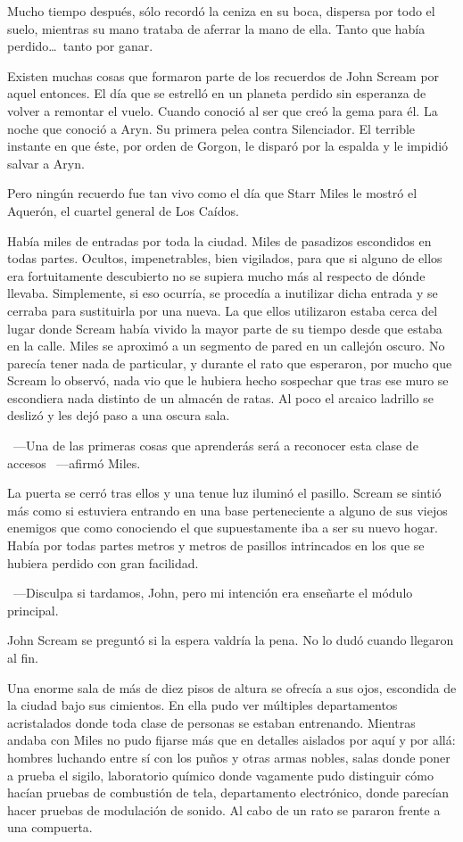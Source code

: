 \noindent
Mucho tiempo después, sólo recordó la ceniza en su boca, dispersa por todo el suelo, mientras su mano trataba de aferrar la mano de ella. Tanto que había perdido\dots\ tanto por ganar.

\parbreak\noindent
Existen muchas cosas que formaron parte de los recuerdos de John Scream por aquel entonces. El día que se estrelló en un planeta perdido sin esperanza de volver a remontar el vuelo. Cuando conoció al ser que creó la gema para él. La noche que conoció a Aryn. Su primera pelea contra Silenciador. El terrible instante en que éste, por orden de Gorgon, le disparó por la espalda y le impidió salvar a Aryn.

Pero ningún recuerdo fue tan vivo como el día que Starr Miles le mostró el Aquerón, el cuartel general de Los Caídos.

Había miles de entradas por toda la ciudad. Miles de pasadizos escondidos en todas partes. Ocultos, impenetrables, bien vigilados, para que si alguno de ellos era fortuitamente descubierto no se supiera mucho más al respecto de dónde llevaba. Simplemente, si eso ocurría, se procedía a inutilizar dicha entrada y se cerraba para sustituirla por una nueva. La que ellos utilizaron estaba cerca del lugar donde Scream había vivido la mayor parte de su tiempo desde que estaba en la calle. Miles se aproximó a un segmento de pared en un callejón oscuro. No parecía tener nada de particular, y durante el rato que esperaron, por mucho que Scream lo observó, nada vio que le hubiera hecho sospechar que tras ese muro se escondiera nada distinto de un almacén de ratas. Al poco el arcaico ladrillo se deslizó y les dejó paso a una oscura sala.

~---Una de las primeras cosas que aprenderás será a reconocer esta clase de accesos ~---afirmó Miles.

La puerta se cerró tras ellos y una tenue luz iluminó el pasillo. Scream se sintió más como si estuviera entrando en una base perteneciente a alguno de sus viejos enemigos que como conociendo el que supuestamente iba a ser su nuevo hogar. Había por todas partes metros y metros de pasillos intrincados en los que se hubiera perdido con gran facilidad.

~---Disculpa si tardamos, John, pero mi intención era enseñarte el módulo principal.

John Scream se preguntó si la espera valdría la pena. No lo dudó cuando llegaron al fin.

Una enorme sala de más de diez pisos de altura se ofrecía a sus ojos, escondida de la ciudad bajo sus cimientos. En ella pudo ver múltiples departamentos acristalados donde toda clase de personas se estaban entrenando. Mientras andaba con Miles no pudo fijarse más que en detalles aislados por aquí y por allá: hombres luchando entre sí con los puños y otras armas nobles, salas donde poner a prueba el sigilo, laboratorio químico donde vagamente pudo distinguir cómo hacían pruebas de combustión de tela, departamento electrónico, donde parecían hacer pruebas de modulación de sonido. Al cabo de un rato se pararon frente a una compuerta.

